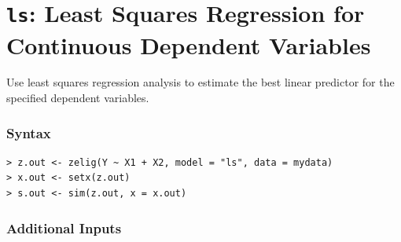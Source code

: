 

\usepackage{Sweave}

\nobibliography*


\section{{\tt ls}: Least Squares Regression for Continuous
Dependent Variables}
\label{ls}

Use least squares regression analysis to estimate the best linear
predictor for the specified dependent variables.

\subsubsection{Syntax}

\begin{verbatim}
> z.out <- zelig(Y ~ X1 + X2, model = "ls", data = mydata)
> x.out <- setx(z.out)
> s.out <- sim(z.out, x = x.out)
\end{verbatim}

\subsubsection{Additional Inputs}  

